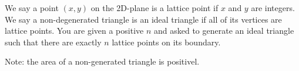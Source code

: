 We say a point $(x,y)$ on the 2D-plane is a lattice point if $x$ and $y$ are integers.
We say a non-degenerated triangle is an ideal triangle if all of its vertices are lattice points.
You are given a positive $n$ and asked to generate an ideal triangle such that 
there are exactly $n$ lattice points on its boundary.

Note: the area of a non-generated triangle is positivel.
